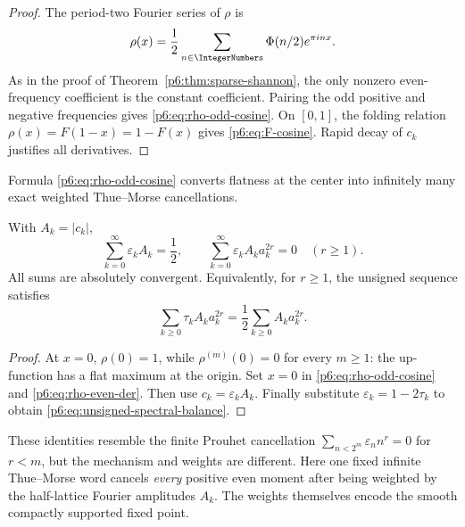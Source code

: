 \documentclass[11pt]{article}
\theoremstyle{definition}
\theoremstyle{remark}
\newcommand{\eps}{\varepsilon}
\begin{document}
\begin{proof}
The period-two Fourier series of \(\rho\) is
\[
 \rho(x)=\frac12\sum_{n\in\IntegerNumbers}\Phi(n/2)e^{\pi i n x}.
\]
As in the proof of Theorem~\ref{p6:thm:sparse-shannon}, the only nonzero even-frequency
coefficient is the constant coefficient.  Pairing the odd positive and negative
frequencies gives \eqref{p6:eq:rho-odd-cosine}.  On \([0,1]\), the folding relation
\(\rho(x)=F(1-x)=1-F(x)\) gives \eqref{p6:eq:F-cosine}.  Rapid decay of \(c_k\) justifies
all derivatives.
\end{proof}

Formula \eqref{p6:eq:rho-odd-cosine} converts flatness at the center into infinitely many exact
weighted Thue--Morse cancellations.

\begin{corollary}
\label{p6:cor:spectral-prouhet}
With \(A_k=|c_k|\),
\begin{equation}
\boxed{
 \sum_{k=0}^{\infty}\eps_kA_k=\frac12,
 \qquad
 \sum_{k=0}^{\infty}\eps_kA_ka_k^{2r}=0\quad(r\ge1).}     \label{p6:eq:spectral-prouhet}
\end{equation}
All sums are absolutely convergent.  Equivalently, for \(r\ge1\), the unsigned sequence
satisfies
\begin{equation}
 \sum_{k\ge0}\tau_kA_ka_k^{2r}
 =\frac12\sum_{k\ge0}A_ka_k^{2r}.                         \label{p6:eq:unsigned-spectral-balance}
\end{equation}
\end{corollary}

\begin{proof}
At \(x=0\), \(\rho(0)=1\), while \(\rho^{(m)}(0)=0\) for every \(m\ge1\): the up-function
has a flat maximum at the origin.  Set \(x=0\) in \eqref{p6:eq:rho-odd-cosine} and
\eqref{p6:eq:rho-even-der}.  Then use \(c_k=\eps_kA_k\).  Finally substitute
\(\eps_k=1-2\tau_k\) to obtain \eqref{p6:eq:unsigned-spectral-balance}.
\end{proof}

These identities resemble the finite Prouhet cancellation
\(\sum_{n<2^m}\eps_nn^r=0\) for \(r<m\), but the mechanism and weights are different.
Here one fixed infinite Thue--Morse word cancels \emph{every} positive even moment after
being weighted by the half-lattice Fourier amplitudes \(A_k\).  The weights themselves
encode the smooth compactly supported fixed point.
\end{document}
